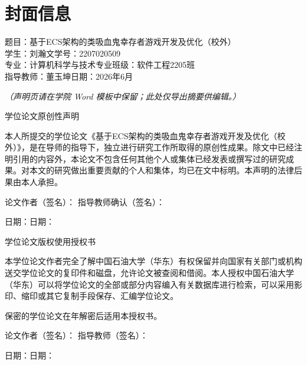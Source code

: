 \documentclass[UTF8,a4paper]{ctexart}
\newcommand{\thesistitle}{基于ECS架构的类吸血鬼幸存者游戏开发及优化（校外）}
\newcommand{\thesisauthor}{刘瀚文}
\newcommand{\thesisstudentid}{2207020509}
\newcommand{\thesismajor}{计算机科学与技术专业}
\newcommand{\thesisclass}{软件工程2205班}
\newcommand{\thesisadvisor}{董玉坤}
\newcommand{\thesisdate}{2026年6月}
\begin{document}
\section*{封面信息}

题目：\thesistitle\\
学生：\thesisauthor \quad 学号：\thesisstudentid\\
专业：\thesismajor \quad 班级：\thesisclass\\
指导教师：\thesisadvisor \quad 日期：\thesisdate

\textit{（声明页请在学院 Word 模板中保留；此处仅导出摘要供编辑。）}







{学位论文原创性声明
}




本人所提交的学位论文《\thesistitle》，是在导师的指导下，独立进行研究工作所取得的原创性成果。除文中已经注明引用的内容外，本论文不包含任何其他个人或集体已经发表或撰写过的研究成果。对本文的研究做出重要贡献的个人和集体，均已在文中标明。本声明的法律后果由本人承担。



 论文作者（签名）：\underline{\hspace{3.8cm}}  指导教师确认（签名）：\underline{\hspace{3.8cm}}

 日期：\underline{\hspace{3.8cm}}\hspace{2.2cm}日期：\underline{\hspace{3.8cm}}



{学位论文版权使用授权书
}


本学位论文作者完全了解中国石油大学（华东）有权保留并向国家有关部门或机构送交学位论文的复印件和磁盘，允许论文被查阅和借阅。本人授权中国石油大学（华东）可以将学位论文的全部或部分内容编入有关数据库进行检索，可以采用影印、缩印或其它复制手段保存、汇编学位论文。



 保密的学位论文在\underline{\hspace{2cm}}年解密后适用本授权书。



 论文作者（签名）：\underline{\hspace{3.8cm}}  指导教师（签名）：\underline{\hspace{3.8cm}}

 日期：\underline{\hspace{3.8cm}}\hspace{2.2cm}日期：\underline{\hspace{3.8cm}}
\end{document}
